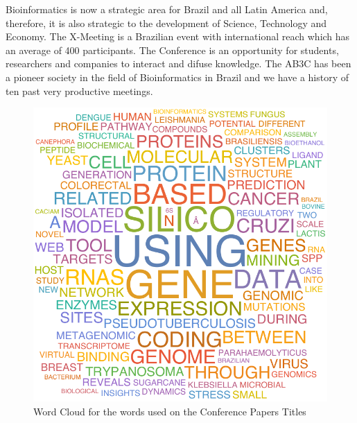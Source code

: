 	
Bioinformatics is now a strategic area for Brazil and all Latin America and,
therefore, it is also strategic to the development of Science, Technology and
Economy. The X-Meeting is a Brazilian event with international reach which has
an average of 400 participants. The Conference is an opportunity for students,
researchers and companies to interact and difuse knowledge. The AB3C has been a
pioneer society in the field of Bioinformatics in Brazil and we have a history
of ten past very productive meetings.

\begin{figure}[h]
    \begin{center}
  \includegraphics[scale=0.7]{wordcloud}
\end{center}
\caption{Word Cloud for the words used on the Conference Papers Titles}
\end{figure}


